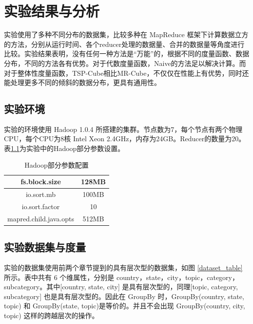 \chapter{实验结果与分析}

实验使用了多种不同分布的数据集，比较多种在 MapReduce 框架下计算数据立方的方法，分别从运行时间、各个reducer处理的数据量、合并的数据量等角度进行比较。实验结果表明，没有任何一种方法是``万能”的，根据不同的度量函数、数据分布，不同的方法各有优势。对于代数度量函数，Naive的方法足以解决计算。而对于整体性度量函数，TSP-Cube相比MR-Cube，不仅仅在性能上有优势，同时还能处理更多不同的倾斜的数据分布，更具有通用性。

\section{实验环境}
实验的环境使用 Hadoop 1.0.4 所搭建的集群。节点数为7，每个节点有两个物理CPU，每个CPU为8核 Intel Xeon 2.4GHz，内存为24GB。Reducer的数量为20。表\ref{hadoop_parameter}为实验中的Hadoop部分参数设置。

\begin{table}[!ht]
\begin{center}
\begin{tabular}{|c|c|}
\hline 
fs.block.size & 128MB \\ 
\hline 
io.sort.mb & 100MB \\ 
\hline 
io.sort.factor & 10 \\ 
\hline 
mapred.child.java.opts & 512MB \\ 
\hline 
\end{tabular} 
\end{center}
\caption{Hadoop部分参数配置}\label{hadoop_parameter}
\end{table}


\section{实验数据集与度量}

实验的数据集使用前两个章节提到的具有层次型的数据集，如图 \ref{dataset_table} 所示。表中共有 6 个维属性，分别是 country，state，city，topic，category，subcategory。其中[country, state, city] 是具有层次型的，同理[topic, category, subcategory] 也是具有层次型的。因此在 GroupBy 时，GroupBy(country, state, topic) 和 GroupBy(state, topic)是等价的。并且不会出现 GroupBy(country, city, topic) 这样的跨越层次的操作。


